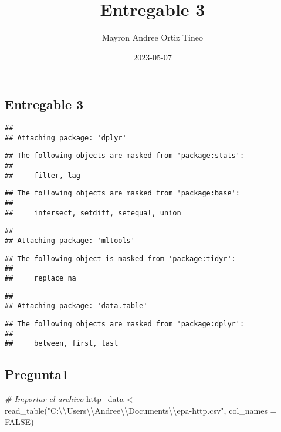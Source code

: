 \documentclass[
]{article}
\title{Entregable 3}
\author{Mayron Andree Ortiz Tineo}
\date{2023-05-07}
\newenvironment{Shaded}{\begin{snugshade}}{\end{snugshade}}
\newcommand{\AttributeTok}[1]{\textcolor[rgb]{0.77,0.63,0.00}{#1}}
\newcommand{\CommentTok}[1]{\textcolor[rgb]{0.56,0.35,0.01}{\textit{#1}}}
\newcommand{\ConstantTok}[1]{\textcolor[rgb]{0.00,0.00,0.00}{#1}}
\newcommand{\FunctionTok}[1]{\textcolor[rgb]{0.00,0.00,0.00}{#1}}
\newcommand{\NormalTok}[1]{#1}
\newcommand{\OtherTok}[1]{\textcolor[rgb]{0.56,0.35,0.01}{#1}}
\newcommand{\SpecialCharTok}[1]{\textcolor[rgb]{0.00,0.00,0.00}{#1}}
\newcommand{\StringTok}[1]{\textcolor[rgb]{0.31,0.60,0.02}{#1}}
\begin{document}
\maketitle

\hypertarget{entregable-3}{%
\subsection{Entregable 3}\label{entregable-3}}

\begin{verbatim}
## 
## Attaching package: 'dplyr'
\end{verbatim}

\begin{verbatim}
## The following objects are masked from 'package:stats':
## 
##     filter, lag
\end{verbatim}

\begin{verbatim}
## The following objects are masked from 'package:base':
## 
##     intersect, setdiff, setequal, union
\end{verbatim}

\begin{verbatim}
## 
## Attaching package: 'mltools'
\end{verbatim}

\begin{verbatim}
## The following object is masked from 'package:tidyr':
## 
##     replace_na
\end{verbatim}

\begin{verbatim}
## 
## Attaching package: 'data.table'
\end{verbatim}

\begin{verbatim}
## The following objects are masked from 'package:dplyr':
## 
##     between, first, last
\end{verbatim}

\hypertarget{pregunta1}{%
\subsection{Pregunta1}\label{pregunta1}}

\begin{Shaded}
\begin{Highlighting}[]
\CommentTok{\# Importar el archivo}
\NormalTok{http\_data }\OtherTok{\textless{}{-}} \FunctionTok{read\_table}\NormalTok{(}\StringTok{"C:}\SpecialCharTok{\textbackslash{}\textbackslash{}}\StringTok{Users}\SpecialCharTok{\textbackslash{}\textbackslash{}}\StringTok{Andree}\SpecialCharTok{\textbackslash{}\textbackslash{}}\StringTok{Documents}\SpecialCharTok{\textbackslash{}\textbackslash{}}\StringTok{epa{-}http.csv"}\NormalTok{, }\AttributeTok{col\_names =} \ConstantTok{FALSE}\NormalTok{)}
\end{Highlighting}
\end{Shaded}
\end{document}
